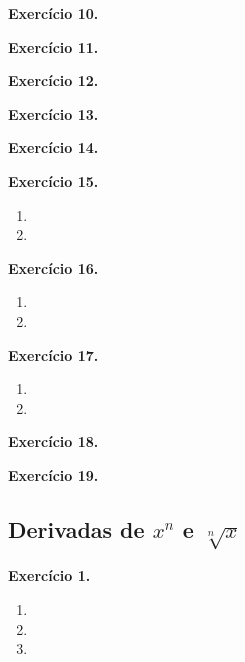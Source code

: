 \documentclass[12pt,a4paper]{article}
\begin{document}
\vspace{0.5cm}
\noindent\textbf{Exercício 10.}

\vspace{0.5cm}
\noindent\textbf{Exercício 11.}

\vspace{0.5cm}
\noindent\textbf{Exercício 12.}

\vspace{0.5cm}
\noindent\textbf{Exercício 13.}

\vspace{0.5cm}
\noindent\textbf{Exercício 14.}

\vspace{0.5cm}
\noindent\textbf{Exercício 15.}
\begin{enumerate}
    \renewcommand{\theenumi}{\alph{enumi}}
    \renewcommand{\labelenumi}{\theenumi)}
    \item 
    \item 
\end{enumerate}

\vspace{0.5cm}
\noindent\textbf{Exercício 16.}
\begin{enumerate}
    \renewcommand{\theenumi}{\alph{enumi}}
    \renewcommand{\labelenumi}{\theenumi)}
    \item 
    \item 
\end{enumerate}

\vspace{0.5cm}
\noindent\textbf{Exercício 17.}
\begin{enumerate}
    \renewcommand{\theenumi}{\alph{enumi}}
    \renewcommand{\labelenumi}{\theenumi)}
    \item 
    \item 
\end{enumerate}

\vspace{0.5cm}
\noindent\textbf{Exercício 18.}

\vspace{0.5cm}
\noindent\textbf{Exercício 19.}

\subsection{Derivadas de $x^n$ e $\sqrt[n]{x}$}

\vspace{0.5cm}
\noindent\textbf{Exercício 1.}
\begin{enumerate}
    \renewcommand{\theenumi}{\alph{enumi}}
    \renewcommand{\labelenumi}{\theenumi)}
    \item 
    \item 
    \item 
\end{enumerate}
\end{document}
